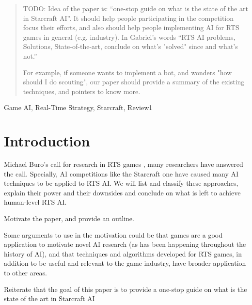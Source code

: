 \documentclass[journal]{IEEEtran}
\begin{document}
\begin{abstract}
TODO: Idea of the paper is: ``one-stop guide on what is the
state of the art in Starcraft AI''. It should help people participating in the competition focus
their efforts, and also should help people implementing AI for RTS games in
general (e.g. industry).  In Gabriel's words ``RTS AI problems, Solutions, State-of-the-art, conclude on what's "solved" since \cite{Buro03rts} and what's not.'' 

For example, if someone wants to implement a bot, and wonders "how should I do scouting", our paper should provide a summary of the existing techniques, and pointers to know more. 
\end{abstract}

\begin{IEEEkeywords}
Game AI, Real-Time Strategy, Starcraft, Review1

\end{IEEEkeywords}

%
\IEEEpeerreviewmaketitle

\section{Introduction}\label{sec:intro}
 Michael Buro's call for research in RTS games \cite{Buro03rts}, many researchers have answered the call. Specially, AI competitions like the Starcraft one have caused many AI techniques to be
applied to RTS AI. We will list and classify these approaches, explain their 
power and their downsides and conclude on what is left to achieve human-level 
RTS AI.

{\color{blue}
Motivate the paper, and provide an outline.

Some arguments to use in the motivation could be that games are a good application to motivate novel AI research (as has been happening throughout the history of AI), and that techniques and algorithms developed for RTS games, in addition to be useful and relevant to the game industry, have broader application to other areas.

Reiterate that the goal of this paper is to provide a one-stop guide on what is the
state of the art in Starcraft AI
}
\end{document}
